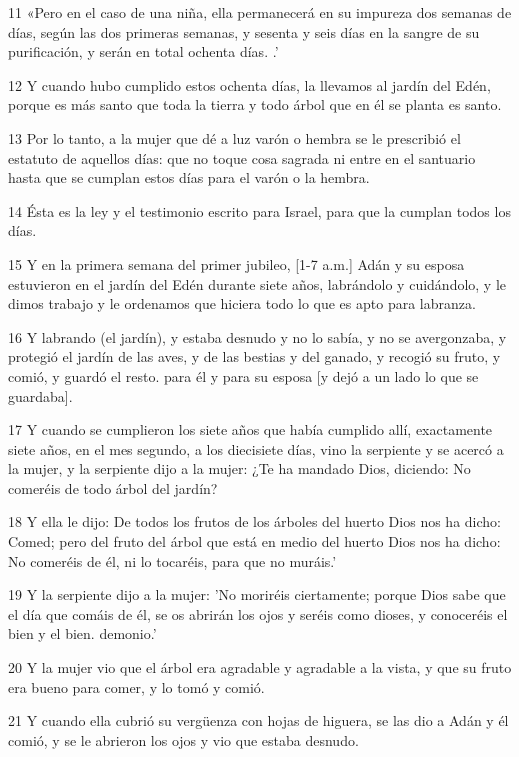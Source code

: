 \par 11 «Pero en el caso de una niña, ella permanecerá en su impureza dos semanas de días, según las dos primeras semanas, y sesenta y seis días en la sangre de su purificación, y serán en total ochenta días. .'
\par 12 Y cuando hubo cumplido estos ochenta días, la llevamos al jardín del Edén, porque es más santo que toda la tierra y todo árbol que en él se planta es santo.
\par 13 Por lo tanto, a la mujer que dé a luz varón o hembra se le prescribió el estatuto de aquellos días: que no toque cosa sagrada ni entre en el santuario hasta que se cumplan estos días para el varón o la hembra.
\par 14 Ésta es la ley y el testimonio escrito para Israel, para que la cumplan todos los días.
\par 15 Y en la primera semana del primer jubileo, [1-7 a.m.] Adán y su esposa estuvieron en el jardín del Edén durante siete años, labrándolo y cuidándolo, y le dimos trabajo y le ordenamos que hiciera todo lo que es apto para labranza.
\par 16 Y labrando (el jardín), y estaba desnudo y no lo sabía, y no se avergonzaba, y protegió el jardín de las aves, y de las bestias y del ganado, y recogió su fruto, y comió, y guardó el resto. para él y para su esposa [y dejó a un lado lo que se guardaba].
\par 17 Y cuando se cumplieron los siete años que había cumplido allí, exactamente siete años, en el mes segundo, a los diecisiete días, vino la serpiente y se acercó a la mujer, y la serpiente dijo a la mujer: ¿Te ha mandado Dios, diciendo: No comeréis de todo árbol del jardín?
\par 18 Y ella le dijo: De todos los frutos de los árboles del huerto Dios nos ha dicho: Comed; pero del fruto del árbol que está en medio del huerto Dios nos ha dicho: No comeréis de él, ni lo tocaréis, para que no muráis.'
\par 19 Y la serpiente dijo a la mujer: 'No moriréis ciertamente; porque Dios sabe que el día que comáis de él, se os abrirán los ojos y seréis como dioses, y conoceréis el bien y el bien. demonio.'
\par 20 Y la mujer vio que el árbol era agradable y agradable a la vista, y que su fruto era bueno para comer, y lo tomó y comió.
\par 21 Y cuando ella cubrió su vergüenza con hojas de higuera, se las dio a Adán y él comió, y se le abrieron los ojos y vio que estaba desnudo.
